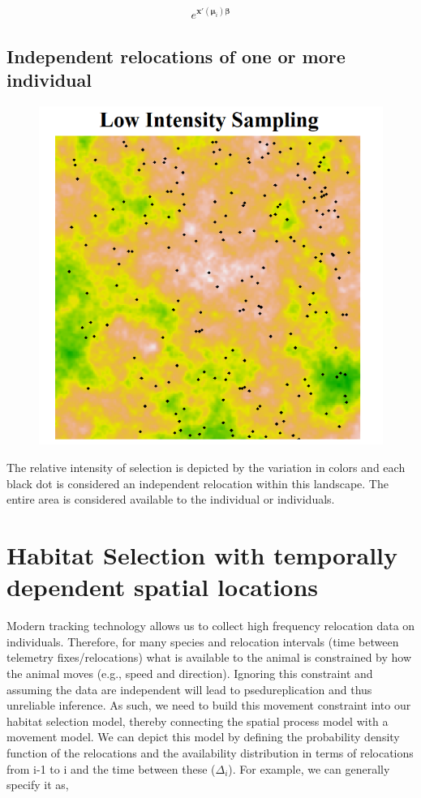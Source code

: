 \documentclass[12pt]{article}
\begin{document}
\begin{align*}
e^{\textbf{x}'(\boldsymbol{\mu}_{i})\boldsymbol{\beta}}
\end{align*}

\subsection{Independent relocations of one or more individual}


\begin{figure}[h!]
\centering
\includegraphics{sampling1.png}
\end{figure}

The relative intensity of selection is depicted by the variation in colors and each black dot is considered an independent relocation within this landscape. The entire area is considered available to the individual or individuals. 


\section{Habitat Selection with temporally dependent spatial locations}

Modern tracking technology allows us to collect high frequency relocation data on individuals. Therefore, for many species and relocation intervals (time between telemetry fixes/relocations) what is available to the animal is constrained by how the animal moves (e.g., speed and direction). Ignoring this constraint and assuming the data are independent will lead to psedureplication and thus unreliable inference. As such, we need to build this movement constraint into our habitat selection model, thereby connecting the spatial process model with a movement model. We can depict this model by defining the probability density function of the relocations and the availability distribution in terms of relocations from i-1 to i and the time between these ($\Delta_{i}$). For example, we can generally specify it as,
\end{document}
